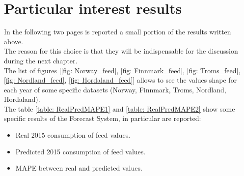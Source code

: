 \section{Particular interest results}
In the following two pages is reported a small portion of the results written above. \\
The reason for this choice is that they will be indispensable for the discussion during the next chapter. \\
The list of figures [\ref{fig: Norway_feed}, \ref{fig: Finnmark_feed}, \ref{fig: Troms_feed}, \ref{fig: Nordland_feed}, \ref{fig: Hordaland_feed}] allows to see the values shape for each year of some specific datasets (Norway, Finnmark, Troms, Nordland, Hordaland).\\
The table \ref{table: RealPredMAPE1} and \ref{table: RealPredMAPE2} show some specific results of the Forecast System, in particular are reported:
\vspace{-5mm}
\begin{itemize}
 \setlength{\itemsep}{-5pt} 
 \item Real 2015 consumption of feed values. 
 \item Predicted 2015 consumption of feed values.
 \item MAPE between real and predicted values.
\end{itemize}

\newpage

\vspace{-5mm}

